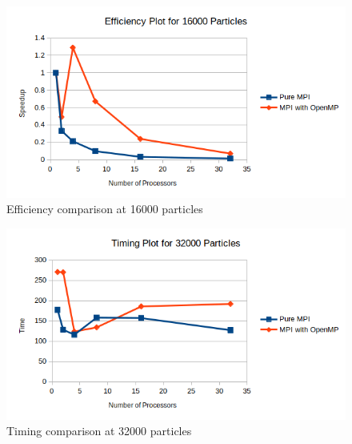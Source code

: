 \documentclass{article}
\begin{document}
\begin{figure}[H]
	\begin{center}
		\hspace*{-0.5cm}                                                           
  		\includegraphics[scale=0.7]{Report_Assets/efficiency16000.png}
  	\end{center}
  	\caption{Efficiency comparison at 16000 particles}
\end{figure}

\begin{figure}[H]
	\begin{center}
		\hspace*{-0.5cm}                                                           
  		\includegraphics[scale=0.7]{Report_Assets/timing32000.png}
  	\end{center}
  	\caption{Timing comparison at 32000 particles}
\end{figure}
\end{document}

